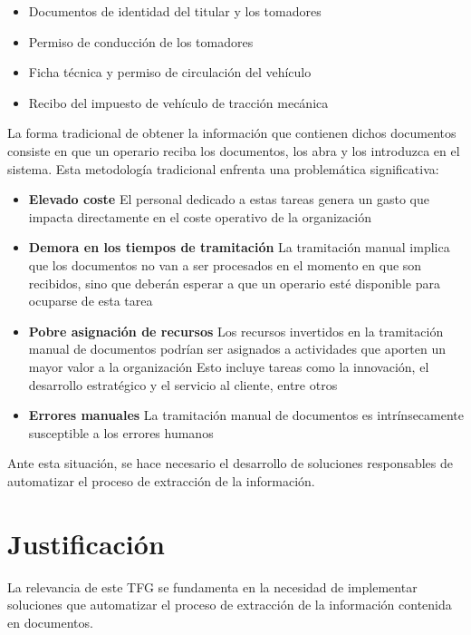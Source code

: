 \begin{itemize}
    \item Documentos de identidad del titular y los tomadores
    \item Permiso de conducción de los tomadores
    \item Ficha técnica y permiso de circulación del vehículo
    \item Recibo del impuesto de vehículo de tracción mecánica
\end{itemize}

La forma tradicional de obtener la información que contienen dichos documentos consiste en que un operario reciba los
documentos, los abra y los introduzca en el sistema.
Esta metodología tradicional enfrenta una problemática significativa:

\begin{itemize}
    \item \textbf{Elevado coste}
    El personal dedicado a estas tareas genera un gasto que impacta directamente en el coste operativo de la
    organización
    \item \textbf{Demora en los tiempos de tramitación}
    La tramitación manual implica que los documentos no van a ser procesados en el momento en que son recibidos, sino
    que deberán esperar a que un operario esté disponible para ocuparse de esta tarea
    \item \textbf{Pobre asignación de recursos}
    Los recursos invertidos en la tramitación manual de documentos podrían ser asignados a actividades que aporten un
    mayor valor a la organización
    Esto incluye tareas como la innovación, el desarrollo estratégico y el servicio al cliente, entre otros
    \item \textbf{Errores manuales}
    La tramitación manual de documentos es intrínsecamente susceptible a los errores humanos
\end{itemize}

Ante esta situación, se hace necesario el desarrollo de soluciones responsables de automatizar el proceso de extracción
de la información.


\section{Justificación}

La relevancia de este TFG se fundamenta en la necesidad de implementar soluciones que automatizar el proceso de
extracción de la información contenida en documentos.


